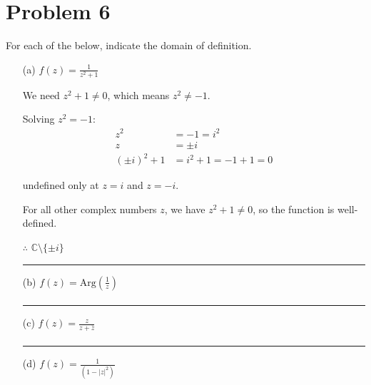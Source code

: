 \documentclass{article}
\begin{document}
\section*{Problem 6}
For each of the below, indicate the domain of definition.
\begin{enumerate}
\item[(a)] $f(z) = \frac{1}{z^2+1}$

 We need $z^2 + 1 \neq 0$, which means $z^2 \neq -1$.

Solving $z^2 = -1$:
\begin{align*}
z^2 &= -1 = i^2 \\
z &= \pm i\\
(\pm i)^2 + 1 &= i^2 + 1 = -1 + 1 = 0
\end{align*}

undefined only at $z = i$ and $z = -i$.

For all other complex numbers $z$, we have $z^2 + 1 \neq 0$, so the function is well-defined.

$\therefore$  $\mathbb{C} \setminus \{\pm i\}$
 \vspace{1cm}
 \hrule
  \item[(b)] $f(z) = \text{Arg}\left(\frac{1}{z}\right)$
\begin{align*}
  
\end{align*}
 \vspace{1cm}
 \hrule
  \item[(c)] $f(z) = \frac{z}{z + \bar{z}}$
\begin{align*}
  
\end{align*}
 \vspace{1cm}
 \hrule
  \item[(d)] $f(z) = \frac{1}{(1-|z|^2)}$
\end{enumerate}
\newpage
\end{document}
